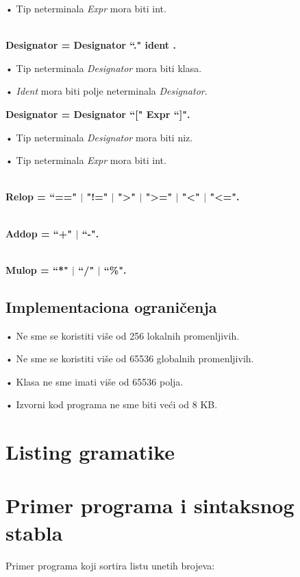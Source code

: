 • Tip neterminala \textit{Expr} mora biti int. 

\hRule \\[0.2cm]

\textbf{Designator = Designator ``." ident .}

• Tip neterminala \textit{Designator} mora biti klasa. 

• \textit{Ident} mora biti polje neterminala \textit{Designator}. 
 
\textbf{Designator = Designator ``[" Expr ``]".}

• Tip neterminala \textit{Designator} mora biti niz.

• Tip neterminala \textit{Expr} mora biti int. 
 
\hRule \\[0.2cm]

\textbf{Relop = ``==" $\mid$ "!=" $\mid$ ">" $\mid$ ">=" $\mid$ "<" $\mid$ "<=".} 

\hRule \\[0.2cm] 
 
\textbf{Addop = ``+" $\mid$ ``-".} 

\hRule \\[0.2cm]

\textbf{Mulop = ``*" $\mid$ ``/" $\mid$ ``\%".} 


\section{Implementaciona ograničenja}
 
• Ne sme se koristiti više od 256 lokalnih promenljivih. 

• Ne sme se koristiti više od 65536 globalnih promenljivih. 

• Klasa ne sme imati više od 65536 polja. 

• Izvorni kod programa ne sme biti veći od 8 KB. 


\chapter{Listing gramatike}



\chapter{Primer programa i sintaksnog stabla}
\label{ch:example}

Primer programa koji sortira listu unetih brojeva:

